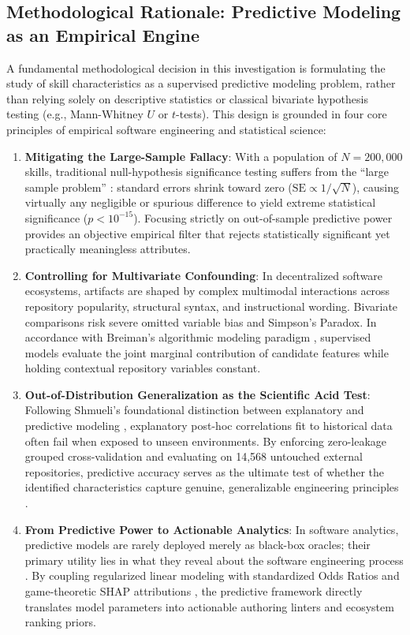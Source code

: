 \documentclass[12pt]{article}
\begin{document}
\subsection{Methodological Rationale: Predictive Modeling as an Empirical Engine}
A fundamental methodological decision in this investigation is formulating the study of skill characteristics as a supervised predictive modeling problem, rather than relying solely on descriptive statistics or classical bivariate hypothesis testing (e.g., Mann-Whitney $U$ or $t$-tests). This design is grounded in four core principles of empirical software engineering and statistical science:
\begin{enumerate}
    \item \textbf{Mitigating the Large-Sample Fallacy}: With a population of $N = 200,000$ skills, traditional null-hypothesis significance testing suffers from the ``large sample problem'' \cite{lin2013too}: standard errors shrink toward zero ($\text{SE} \propto 1/\sqrt{N}$), causing virtually any negligible or spurious difference to yield extreme statistical significance ($p < 10^{-15}$). Focusing strictly on out-of-sample predictive power provides an objective empirical filter that rejects statistically significant yet practically meaningless attributes.
    \item \textbf{Controlling for Multivariate Confounding}: In decentralized software ecosystems, artifacts are shaped by complex multimodal interactions across repository popularity, structural syntax, and instructional wording. Bivariate comparisons risk severe omitted variable bias and Simpson's Paradox. In accordance with Breiman's algorithmic modeling paradigm \cite{breiman2001statistical}, supervised models evaluate the joint marginal contribution of candidate features while holding contextual repository variables constant.
    \item \textbf{Out-of-Distribution Generalization as the Scientific Acid Test}: Following Shmueli's foundational distinction between explanatory and predictive modeling \cite{shmueli2010explain}, explanatory post-hoc correlations fit to historical data often fail when exposed to unseen environments. By enforcing zero-leakage grouped cross-validation and evaluating on 14,568 untouched external repositories, predictive accuracy serves as the ultimate test of whether the identified characteristics capture genuine, generalizable engineering principles \cite{roberts2017cross,menzies2010defect}.
    \item \textbf{From Predictive Power to Actionable Analytics}: In software analytics, predictive models are rarely deployed merely as black-box oracles; their primary utility lies in what they reveal about the software engineering process \cite{menzies2010defect,tantithamthavorn2020code}. By coupling regularized linear modeling with standardized Odds Ratios and game-theoretic SHAP attributions \cite{lundberg2017unified,molnar2020interpretable}, the predictive framework directly translates model parameters into actionable authoring linters and ecosystem ranking priors.
\end{enumerate}
\end{document}

